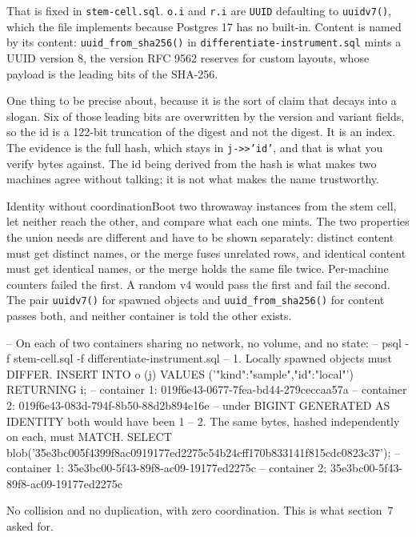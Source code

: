 That is fixed in \texttt{stem-cell.sql}. \texttt{o.i} and \texttt{r.i} are \texttt{UUID} defaulting to \texttt{uuidv7()}, which the file implements because Postgres 17 has no built-in. Content is named by its content: \texttt{uuid\_from\_sha256()} in \texttt{differentiate-instrument.sql} mints a UUID version 8, the version RFC 9562 reserves for custom layouts, whose payload is the leading bits of the SHA-256.

One thing to be precise about, because it is the sort of claim that decays into a slogan. Six of those leading bits are overwritten by the version and variant fields, so the id is a 122-bit truncation of the digest and not the digest. It is an index. The evidence is the full hash, which stays in \texttt{j->>'id'}, and that is what you verify bytes against. The id being derived from the hash is what makes two machines agree without talking; it is not what makes the name trustworthy.

\begin{Correspondence}{Identity without coordination}{Boot two throwaway instances from the stem cell, let neither reach the other, and compare what each one mints.}
The two properties the union needs are different and have to be shown separately: distinct content must get distinct names, or the merge fuses unrelated rows, and identical content must get identical names, or the merge holds the same file twice. Per-machine counters failed the first. A random v4 would pass the first and fail the second. The pair \texttt{uuidv7()} for spawned objects and \texttt{uuid\_from\_sha256()} for content passes both, and neither container is told the other exists.
\begin{Check}
-- On each of two containers sharing no network, no volume, and no state:
--   psql -f stem-cell.sql -f differentiate-instrument.sql
-- 1. Locally spawned objects must DIFFER.
INSERT INTO o (j) VALUES ('{"kind":"sample","id":"local"}') RETURNING i;
--   container 1: 019f6e43-0677-7fea-bd44-279ceccaa57a
--   container 2: 019f6e43-083d-794f-8b50-88d2b894e16e
--   under BIGINT GENERATED AS IDENTITY both would have been 1
-- 2. The same bytes, hashed independently on each, must MATCH.
SELECT blob('35e3bc005f4399f8ac0919177ed2275c54b24cff170b833141f815cdc0823c37');
--   container 1: 35e3bc00-5f43-89f8-ac09-19177ed2275c
--   container 2: 35e3bc00-5f43-89f8-ac09-19177ed2275c
\end{Check}
No collision and no duplication, with zero coordination. This is what section~7 asked for.
\end{Correspondence}

